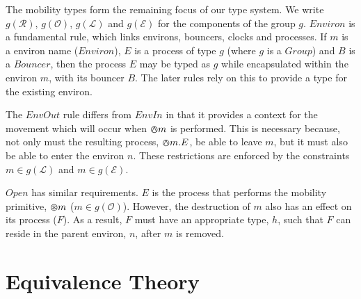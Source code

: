 \documentclass[orivec,envcountsame]{llncs}
\begin{document}
The mobility types form the remaining focus of our type system.  We
write $g(\mathscr{R})$, $g(\mathscr{O})$, $g(\mathscr{L})$ and
$g(\mathscr{E})$ for the components of the group $g$.  $Environ$ is a
fundamental rule, which links environs, bouncers, clocks and processes.
If $m$ is a environ name ($Environ$), $E$ is a process of type $g$
(where $g$ is a $Group$) and $B$ is a $Bouncer$, then the process $E$
may be typed as $g$ while encapsulated within the environ $m$, with its
bouncer $B$.  The later rules rely on this to provide a type for the
existing environ.


The $EnvOut$ rule differs from $EnvIn$ in that it provides a context for
the movement which will occur when $\varowedge m$ is performed.  This is
necessary because, not only must the resulting process, $\varowedge m.E$,
be able to leave $m$, but it must also be able to enter the environ $n$.
These restrictions are enforced by the constraints $m \in
g(\mathscr{L})$ and $m \in g(\mathscr{E})$.

$Open$ has similar requirements.  $E$ is the process that performs the
mobility primitive, $\varoast m$ ($m \in g(\mathscr{O})$).  However,
the destruction of $m$ also has an effect on its process ($F$).  As a
result, $F$ must have an appropriate type, $h$, such that $F$ can reside
in the parent environ, $n$, after $m$ is removed. 


\section{Equivalence Theory}
\label{sec:equivalence-theory}
\end{document}
